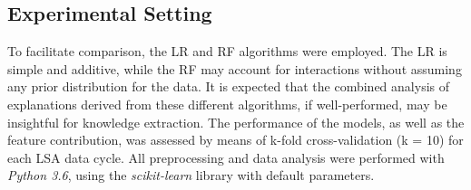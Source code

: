 \subsection{Experimental Setting}

To facilitate comparison, the LR and RF  algorithms were employed. The LR is simple and additive, while the RF may account for interactions without assuming any prior distribution for the data. It is expected that the combined analysis of explanations derived from these different algorithms, if well-performed, may be insightful for knowledge extraction. The performance of the models, as well as the feature contribution, was assessed by means of k-fold cross-validation (k = 10) for each LSA data cycle. All preprocessing and data analysis were performed with \textit{Python 3.6}, using the \textit{scikit-learn} library with default parameters. 

